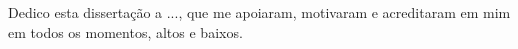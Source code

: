 

\begin{ntdedicatory}

Dedico esta dissertação a ..., que me apoiaram, motivaram e acreditaram em mim em todos os momentos, altos e baixos.

\end{ntdedicatory}